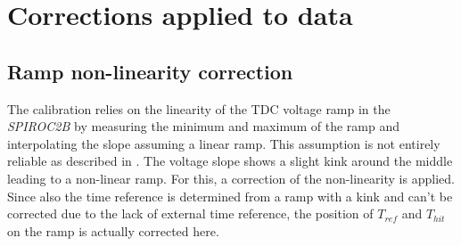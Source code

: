 \section{Corrections applied to data}

\subsection{Ramp non-linearity correction}
\label{subsec:lin_corr}

The calibration relies on the linearity of the TDC voltage ramp in the \textit{SPIROC2B} by measuring the minimum and maximum of the ramp and interpolating the slope assuming a linear ramp. This assumption is not entirely reliable as described in \cite{Hartbrich2011, Brianne2012}. The voltage slope shows a slight kink around the middle leading to a non-linear ramp. For this, a correction of the non-linearity is applied. Since also the time reference is determined from a ramp with a kink and can't be corrected due to the lack of external time reference, the position of $T_{ref}$ and $T_{hit}$ on the ramp is actually corrected here.


